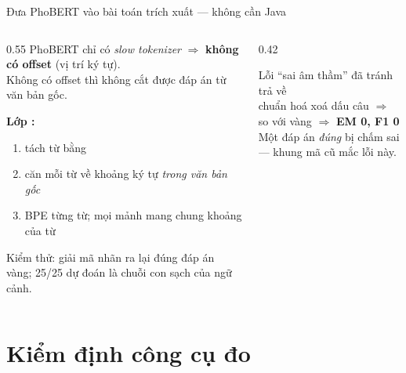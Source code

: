 \begin{frame}{Đưa PhoBERT vào bài toán trích xuất --- không cần Java}
\begin{columns}[T]
\begin{column}{0.55\textwidth}
\small
PhoBERT chỉ có \emph{slow tokenizer} $\Rightarrow$ \textbf{không có offset} (vị trí ký tự).\\
Không có offset thì không cắt được đáp án từ văn bản gốc.

\vspace{0.5em}
\textbf{Lớp :}
\begin{enumerate}\footnotesize
\item tách từ bằng 
\item căn mỗi từ về khoảng ký tự \emph{trong văn bản gốc}
\item BPE từng từ; mọi mảnh mang chung khoảng của từ
\end{enumerate}

\vspace{0.3em}
\footnotesize Kiểm thử: giải mã nhãn ra lại đúng đáp án vàng; 25/25 dự đoán là chuỗi con sạch của ngữ cảnh.
\end{column}
\begin{column}{0.42\textwidth}
\begin{block}{Lỗi ``sai âm thầm'' đã tránh}
\footnotesize
{} trả về \\
chuẩn hoá xoá dấu câu $\Rightarrow$ \\
so với vàng  $\Rightarrow$ \textbf{EM 0, F1 0}\\[3pt]
Một đáp án \emph{đúng} bị chấm sai --- khung mã cũ mắc lỗi này.
\end{block}
\end{column}
\end{columns}
\end{frame}

\section{Kiểm định công cụ đo}

